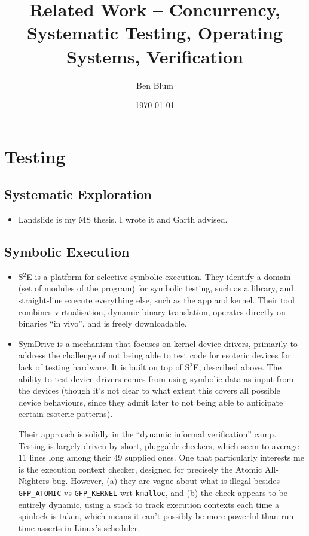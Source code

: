 \documentclass{article}
\begin{document}

\title{Related Work -- Concurrency, Systematic Testing, Operating Systems, Verification}
\author{Ben Blum}
\date{\today}
\maketitle


\section{Testing}

\subsection{Systematic Exploration}
\begin{itemize}
	\item Landslide \cite{Landslide} is my MS thesis. I wrote it and Garth advised.
\end{itemize}

\subsection{Symbolic Execution}
\begin{itemize}
	\item S$^2$E \cite{s2e} is a platform for selective symbolic execution. They identify a domain (set of modules of the program) for symbolic testing, such as a library, and straight-line execute everything else, such as the app and kernel. Their tool combines virtualisation, dynamic binary translation, operates directly on binaries ``in vivo'', and is freely downloadable.

	\item SymDrive \cite{symdrive} is a mechanism that focuses on kernel device drivers, primarily to address the challenge of not being able to test code for esoteric devices for lack of testing hardware. It is built on top of S$^2$E, described above.
		The ability to test device drivers comes from using symbolic data as input from the devices (though it's not clear to what extent this covers all possible device behaviours, since they admit later to not being able to anticipate certain esoteric patterns).

		Their approach is solidly in the ``dynamic informal verification'' camp. Testing is largely driven by short, pluggable checkers, which seem to average 11 lines long among their 49 supplied ones. One that particularly interests me is the execution context checker, designed for precisely the Atomic All-Nighters bug. However, (a) they are vague about what is illegal besides {\tt GFP\_ATOMIC} vs {\tt GFP\_KERNEL} wrt {\tt kmalloc}, and (b) the check appears to be entirely dynamic, using a stack to track execution contexts each time a spinlock is taken, which means it can't possibly be more powerful than run-time asserts in Linux's scheduler.
\end{itemize}
\end{document}
